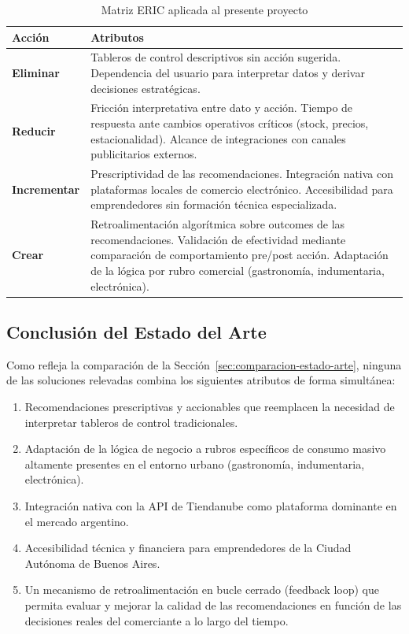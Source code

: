 \begin{table}[h]
\centering
\caption{Matriz ERIC aplicada al presente proyecto}
\label{tab:eric}
\renewcommand{\arraystretch}{1.3}
\footnotesize
\setlength{\tabcolsep}{4pt}
\begin{tabular}{|m{2.5cm}|m{9.5cm}|}
\hline
\textbf{Acción} & \textbf{Atributos} \\
\hline
\textbf{Eliminar} & Tableros de control descriptivos sin acción sugerida. Dependencia del usuario para interpretar datos y derivar decisiones estratégicas. \\
\hline
\textbf{Reducir} & Fricción interpretativa entre dato y acción. Tiempo de respuesta ante cambios operativos críticos (stock, precios, estacionalidad). Alcance de integraciones con canales publicitarios externos. \\
\hline
\textbf{Incrementar} & Prescriptividad de las recomendaciones. Integración nativa con plataformas locales de comercio electrónico. Accesibilidad para emprendedores sin formación técnica especializada. \\
\hline
\textbf{Crear} & Retroalimentación algorítmica sobre outcomes de las recomendaciones. Validación de efectividad mediante comparación de comportamiento pre/post acción. Adaptación de la lógica por rubro comercial (gastronomía, indumentaria, electrónica). \\
\hline
\end{tabular}
\end{table}

\subsection{Conclusión del Estado del Arte}
\label{sec:conclusion-estado-arte}

Como refleja la comparación de la Sección~\ref{sec:comparacion-estado-arte}, ninguna de las soluciones relevadas combina los siguientes atributos de forma simultánea:

\begin{enumerate}
    \item Recomendaciones prescriptivas y accionables que reemplacen la necesidad de interpretar tableros de control tradicionales.

    \item Adaptación de la lógica de negocio a rubros específicos de consumo masivo altamente presentes en el entorno urbano (gastronomía, indumentaria, electrónica).

    \item Integración nativa con la API de Tiendanube como plataforma dominante en el mercado argentino.

    \item Accesibilidad técnica y financiera para emprendedores de la Ciudad Autónoma de Buenos Aires.

    \item Un mecanismo de retroalimentación en bucle cerrado (feedback loop) que permita evaluar y mejorar la calidad de las recomendaciones en función de las decisiones reales del comerciante a lo largo del tiempo.
\end{enumerate}

